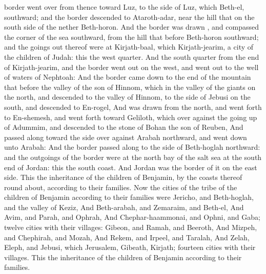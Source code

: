{border went
over from thence toward
Luz, to the
side of
Luz, which
{}
Beth-el,
southward; and the
border
descended to
Ataroth-adar, near the
hill that
{} on the south
side of the
nether
Beth-horon.
And the
border was
drawn
{}, and
compassed the
corner of the
sea
southward, from the
hill that
{}
before
Beth-horon
southward; and the goings
out thereof were at
Kirjath-baal, which
{}
Kirjath-jearim, a
city of the
children of
Judah: this
{} the
west
quarter.
And the
south
quarter
{} from the
end of
Kirjath-jearim, and the
border went
out on the
west, and went
out to the
well of
waters of
Nephtoah:
And the
border came
down to the
end of the
mountain that
{}
before the
valley of the
son of
Hinnom,
{} which
{} in the
valley of the
giants on the
north, and
descended to the
valley of
Hinnom, to the
side of
Jebusi on the
south, and
descended to
En-rogel,
And was
drawn from the
north, and went
forth to
En-shemesh, and went
forth toward
Geliloth, which
{} over
against the going
up of
Adummim, and
descended to the
stone of
Bohan the
son of
Reuben,
And passed
along toward the
side over
against
Arabah
northward, and went
down unto
Arabah:
And the
border passed
along to the
side of
Beth-hoglah
northward: and the
outgoings of the
border were at the
north
bay of the
salt
sea at the
south
end of
Jordan: this
{} the
south
coast.
And
Jordan was the
border of it on the
east
side. This
{} the
inheritance of the
children of
Benjamin, by the
coasts thereof round
about, according to their
families.
Now the
cities of the
tribe of the
children of
Benjamin according to their
families were
Jericho, and
Beth-hoglah, and the
valley of
Keziz,
And
Beth-arabah, and
Zemaraim, and
Beth-el,
And
Avim, and
Parah, and
Ophrah,
And
Chephar-haammonai, and
Ophni, and
Gaba;
twelve
cities with their
villages:
Gibeon, and
Ramah, and
Beeroth,
And
Mizpeh, and
Chephirah, and
Mozah,
And
Rekem, and
Irpeel, and
Taralah,
And
Zelah,
Eleph, and
Jebusi, which
{}
Jerusalem,
Gibeath,
{}
Kirjath;
fourteen
cities with their
villages. This
{} the
inheritance of the
children of
Benjamin according to their
families.

}

